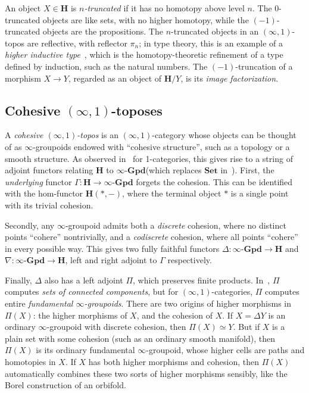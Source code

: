 \documentclass[copyright,12pt]{eptcs}
\newcommand{\ig}{\ensuremath{\infty\text{-}\mathbf{Gpd}}\xspace}
\renewcommand{\H}{\ensuremath{\mathbf{H}}\xspace}
\newcommand{\io}{\ensuremath{(\infty,1)}}
\begin{document}
An object $X\in\H$ is \emph{$n$-truncated} if it has no homotopy above level $n$.
The $0$-truncated objects are like sets, with no higher homotopy, while the $(-1)$-truncated objects are the propositions.
The $n$-truncated objects in an \io-topos are reflective, with reflector $\pi_n$; in type theory, this is
an example of
a \emph{higher inductive type}~\cite{ShulmanLumsdaine,hottbook},%
which is the homotopy-theoretic refinement of a type defined by induction, such as the natural numbers.
The $(-1)$-truncation of a morphism $X\to Y$, regarded as an object of $\H/Y$, is its \emph{image factorization}.


\subsection{Cohesive \io-toposes}
\label{sec:cohesion}

A \emph{cohesive \io-topos} is an \io-category whose objects can be thought of as $\infty$-groupoids
endowed with ``cohesive structure'', such as a topology or a smooth structure.
As observed in~\cite{Lawvere} for 1-categories, this gives rise to a string of adjoint functors relating $\H$ to \ig (which replaces $\mathbf{Set}$ in~\cite{Lawvere}).
First, the \emph{underlying} functor $\Gamma:\H\to\ig$ forgets the cohesion.
This can be identified with the hom-functor $\H(*,-)$, where the terminal object $*$ is a single point with its trivial cohesion.

Secondly, any $\infty$-groupoid admits both a \emph{discrete} cohesion, where no distinct points ``cohere'' nontrivially, and a \emph{codiscrete} cohesion, where all points ``cohere'' in every possible way.
This gives two fully faithful functors $\Delta: \ig\to\H$ and $\nabla:\ig\to\H$, left and right adjoint to $\Gamma$ respectively.

Finally, $\Delta$ also has a left adjoint $\Pi$, which preserves finite products.
In~\cite{Lawvere}, $\Pi$ computes \emph{sets of connected components}, but for \io-categories, $\Pi$ computes entire \emph{fundamental $\infty$-groupoids}.
There are two origins of higher morphisms in $\Pi(X)$: the higher morphisms of $X$, and the cohesion of $X$.
If $X=\Delta Y$ is an ordinary $\infty$-groupoid with discrete cohesion, then $\Pi(X) \simeq Y$.
But if $X$ is a plain set with some cohesion (such as an ordinary smooth manifold), then $\Pi(X)$ is its ordinary fundamental $\infty$-groupoid, whose higher cells are paths and homotopies in $X$.
If $X$ has both higher morphisms and cohesion, then $\Pi(X)$ automatically combines these two sorts of higher morphisms sensibly, like the Borel construction of an orbifold.
\end{document}
